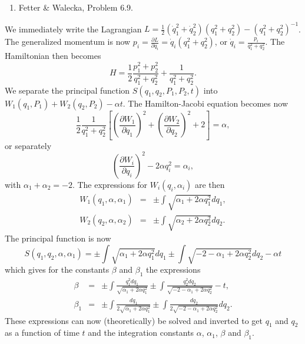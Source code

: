 \documentclass[letterpaper,11pt]{article}
\begin{document}
\begin{enumerate}[resume]
 \item Fetter \& Walecka, Problem 6.9.
\end{enumerate}

We immediately write the Lagrangian $L = \frac{1}{2} (\dot{q}_1^2 + \dot{q}_2^2) (q_1^2 + q_2^2) - (q_1^2 + q_2^2)^{-1}$.  The generalized momentum is now $p_i = \frac{\partial L}{\partial q_i} = \dot{q}_i (q_1^2 + q_2^2)$, or $\dot{q}_i = \frac{p_i}{q_1^2 + q_2^2}$.  The Hamiltonian then becomes
\begin{equation*}
 H = \frac{1}{2} \frac{p_1^2 + p_2^2}{q_1^2 + q_2^2} + \frac{1}{q_1^2 + q_2^2}.
\end{equation*}
We separate the principal function $S(q_1,q_2,P_1,P_2,t)$ into $W_1(q_1,P_1) + W_2(q_2,P_2) - \alpha t$.  The Hamilton-Jacobi equation becomes now
\begin{equation*}
 \frac{1}{2} \frac{1}{q_1^2 + q_2^2} \left[ \left(\frac{\partial W_1}{\partial q_1}\right)^2 + \left(\frac{\partial W_2}{\partial q_2}\right)^2 + 2 \right] = \alpha,
\end{equation*}
or separately
\begin{equation*}
 \left(\frac{\partial W_i}{\partial q_i}\right)^2 - 2\alpha q_i^2 = \alpha_i,
\end{equation*}
with $\alpha_1 + \alpha_2 = -2$.  The expressions for $W_i(q_i,\alpha_i)$ are then
\begin{eqnarray*}
 W_1(q_1,\alpha,\alpha_1) & = & \pm \int \sqrt{\alpha_1 + 2\alpha q_1^2} dq_1, \\
 W_2(q_2,\alpha,\alpha_2) & = & \pm \int \sqrt{\alpha_2 + 2\alpha q_2^2} dq_2.
\end{eqnarray*}
The principal function is now
\begin{equation*}
 S(q_1,q_2,\alpha,\alpha_1) = \pm \int \sqrt{\alpha_1 + 2\alpha q_1^2} dq_1 \pm \int \sqrt{-2 -\alpha_1 + 2\alpha q_2^2} dq_2 - \alpha t
\end{equation*}
which gives for the constants $\beta$ and $\beta_1$ the expressions
\begin{eqnarray*}
 \beta & = & \pm \int \frac{q_1^2 dq_1}{\sqrt{\alpha_1 + 2\alpha q_1^2}} \pm \int \frac{q_2^2 dq_2}{\sqrt{-2 -\alpha_1 + 2\alpha q_2^2}} - t, \\
 \beta_1 & = & \pm \int \frac{dq_1}{2\sqrt{\alpha_1 + 2\alpha q_1^2}} \pm \int \frac{dq_2}{2\sqrt{-2 -\alpha_1 + 2\alpha q_2^2}} dq_2.
\end{eqnarray*}
These expressions can now (theoretically) be solved and inverted to get $q_1$ and $q_2$ as a function of time $t$ and the integration constants $\alpha$, $\alpha_1$, $\beta$ and $\beta_1$.
\end{document}
